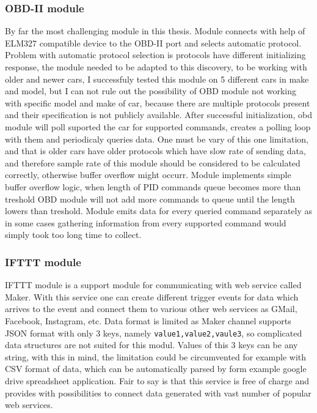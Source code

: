 \subsubsection{OBD-II module} %
By far the most challenging module in this thesis. Module connects with help of ELM327 compatible device to the OBD-II port and selects automatic protocol. Problem with automatic protocol selection is protocols have different initializing response, the module needed to be adapted to this discovery, to be working with older and newer cars, I successfuly tested this module on 5 different cars in make and model, but I can not rule out the possibility of OBD module not working with specific model and make of car, because there are multiple protocols present and their specification is not publicly available. After successful initialization, obd module will poll suported the car for supported commands, creates a polling loop with them and periodicaly queries data. One must be vary of this one limitation, and that is older cars have older protocols which have slow rate of sending data, and therefore sample rate of this module should be considered to be calculated correctly, otherwise buffer overflow might occurr. Module implements simple buffer overflow logic, when length of PID commands queue becomes more than treshold OBD module will not add more commands to queue until the length lowers than treshold. Module emits data for every queried command separately as in some cases gathering information from every supported command would simply took too long time to collect.
\label{ssub:obd_ii_module}
\subsubsection{IFTTT module} %
\label{ssub:ifttt_module}
IFTTT module is a support module for communicating with web service called Maker. With this service one can create different trigger events for data which arrives to the event and connect them to various other web services as GMail, Facebook, Instagram, etc. Data format is limited as Maker channel supports JSON format with only 3 keys, namely \verb|value1,value2,vaule3|, so complicated data structures are not suited for this modul. Values of this 3 keys can be any string, with this in mind, the limitation could be circumvented for example with CSV format of data, which can be automatically parsed by form example google drive spreadsheet application. Fair to say is that this service is free of charge and provides with possibilities to connect data generated with vast number of popular web services.
